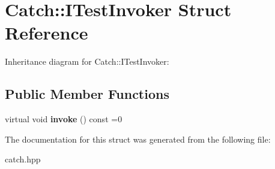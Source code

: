\hypertarget{structCatch_1_1ITestInvoker}{}\section{Catch\+:\+:I\+Test\+Invoker Struct Reference}
\label{structCatch_1_1ITestInvoker}


Inheritance diagram for Catch\+:\+:I\+Test\+Invoker\+:
\subsection*{Public Member Functions}
\begin{DoxyCompactItemize}
\item 
virtual void {\bfseries invoke} () const =0\hypertarget{structCatch_1_1ITestInvoker_a6fcd5c5b67d6d5ade6491ff33411ca7f}{}\label{structCatch_1_1ITestInvoker_a6fcd5c5b67d6d5ade6491ff33411ca7f}

\end{DoxyCompactItemize}


The documentation for this struct was generated from the following file\+:\begin{DoxyCompactItemize}
\item 
catch.\+hpp\end{DoxyCompactItemize}
